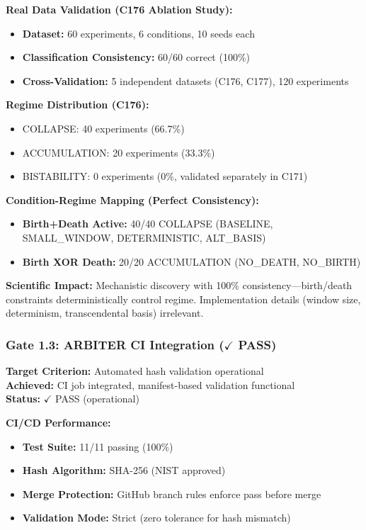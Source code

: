 \documentclass[11pt]{article}
\begin{document}
\textbf{Real Data Validation (C176 Ablation Study):}
\begin{itemize}
\item \textbf{Dataset:} 60 experiments, 6 conditions, 10 seeds each
\item \textbf{Classification Consistency:} 60/60 correct (100\%)
\item \textbf{Cross-Validation:} 5 independent datasets (C176, C177), 120 experiments
\end{itemize}

\textbf{Regime Distribution (C176):}
\begin{itemize}
\item COLLAPSE: 40 experiments (66.7\%)
\item ACCUMULATION: 20 experiments (33.3\%)
\item BISTABILITY: 0 experiments (0\%, validated separately in C171)
\end{itemize}

\textbf{Condition-Regime Mapping (Perfect Consistency):}
\begin{itemize}
\item \textbf{Birth+Death Active:} 40/40 COLLAPSE (BASELINE, SMALL\_WINDOW, DETERMINISTIC, ALT\_BASIS)
\item \textbf{Birth XOR Death:} 20/20 ACCUMULATION (NO\_DEATH, NO\_BIRTH)
\end{itemize}

\textbf{Scientific Impact:} Mechanistic discovery with 100\% consistency—birth/death constraints deterministically control regime. Implementation details (window size, determinism, transcendental basis) irrelevant.

\subsubsection{Gate 1.3: ARBITER CI Integration ($\checkmark$ PASS)}

\textbf{Target Criterion:} Automated hash validation operational\\
\textbf{Achieved:} CI job integrated, manifest-based validation functional\\
\textbf{Status:} $\checkmark$ PASS (operational)

\textbf{CI/CD Performance:}
\begin{itemize}
\item \textbf{Test Suite:} 11/11 passing (100\%)
\item \textbf{Hash Algorithm:} SHA-256 (NIST approved)
\item \textbf{Merge Protection:} GitHub branch rules enforce pass before merge
\item \textbf{Validation Mode:} Strict (zero tolerance for hash mismatch)
\end{itemize}
\end{document}
